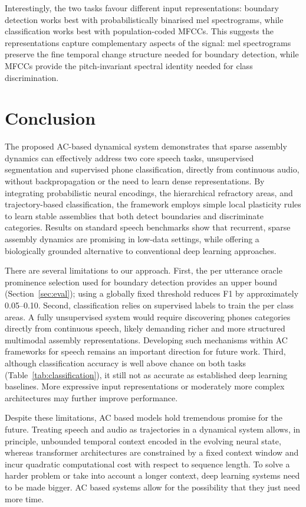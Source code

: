 Interestingly, the two tasks favour different input representations: boundary detection works best with probabilistically binarised mel spectrograms, while classification works best with population-coded MFCCs. This suggests the representations capture complementary aspects of the signal: mel spectrograms preserve the fine temporal change structure needed for boundary detection, while MFCCs provide the pitch-invariant spectral identity needed for class discrimination.

\section{Conclusion}
The proposed AC-based dynamical system demonstrates that sparse assembly dynamics can effectively address two core speech tasks, unsupervised segmentation and supervised phone classification, directly from continuous audio, without backpropagation or the need to learn dense representations. By integrating probabilistic neural encodings, the hierarchical refractory areas, and trajectory-based classification, the framework employs simple local plasticity rules to learn stable assemblies that both detect boundaries and discriminate categories. Results on standard speech benchmarks show that recurrent, sparse assembly dynamics are promising in low-data settings, while offering a biologically grounded alternative to conventional deep learning approaches.

There are several limitations to our approach. First, the per utterance oracle prominence selection used for boundary detection provides an upper bound (Section~\ref{sec:eval}); using a globally fixed threshold reduces F1 by approximately 0.05--0.10. Second, classification relies on supervised labels to train the per class areas. A fully unsupervised system would require discovering phones categories directly from continuous speech, likely demanding richer and more structured multimodal assembly representations. Developing such mechanisms within AC frameworks for speech remains an important direction for future work. Third, although classification accuracy is well above chance on both tasks (Table~\ref{tab:classification}), it still not as accurate as established deep learning baselines. More expressive input representations or moderately more complex architectures may further improve performance.


Despite these limitations, AC based models hold tremendous promise for the future. Treating speech and audio as trajectories in a dynamical system allows, in principle, unbounded temporal context encoded in the evolving neural state, whereas transformer architectures are constrained by a fixed context window and incur quadratic computational cost with respect to sequence length. To solve a harder problem or take into account a longer context, deep learning systems need to be made bigger. AC based systems allow for the possibility that they just need more time.




